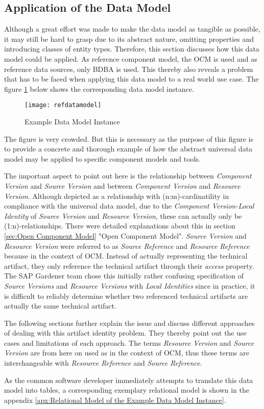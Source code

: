 \subsection{Application of the Data Model} \label{sec:Application of the Data Model}
Although a great effort was made to make the data model as tangible as possible, it may still be hard to grasp due to its abstract nature, omitting properties and introducing classes of entity types. Therefore, this section discusses how this data model could be applied. As reference component model, the OCM is used and as reference data sources, only BDBA is used. This thereby also reveals a problem that has to be faced when applying this data model to a real world use case. The figure \ref{fig:RefDataModel} below shows the corresponding data model instance.\par

\begin{figure}[H]
	\centering
	\texttt{[image: refdatamodel]}
	\caption[Data Model Instance]{Example Data Model Instance }
	\label{fig:RefDataModel}
\end{figure}

The figure is very crowded. But this is necessary as the purpose of this figure is to provide a concrete and thorough example of how the abstract universal data model may be applied to specific component models and tools.\par
The important aspect to point out here is the relationship between \emph{Component Version} and \emph{Source Version} and between \emph{Component Version} and \emph{Resource Version}. Although depicted as a relationship with (n:m)-cardinatility in compliance with the universal data model, due to the \emph{Component Version-Local Identity} of \emph{Source Version} and \emph{Resource Version}, these can actually only be (1:n)-relationships. There were detailed explanations about this in section \ref{sec:Open Component Model} "Open Component Model". \emph{Source Version} and \emph{Resource Version} were referred to as \emph{Source Reference} and \emph{Resource Reference} because in the context of OCM. Instead of actually representing the technical artifact, they only reference the technical artifact through their \emph{access} property. The SAP Gardener team chose this initially rather confusing specification of \emph{Source Versions} and \emph{Resource Versions} with \emph{Local Identities} since in practice, it is difficult to reliably determine whether two referenced technical artifacts are actually the same technical artifact.\par 
The following sections further explain the issue and discuss different approaches of dealing with this artifact identity problem. They thereby point out the use cases and limitations of each approach. The terms \emph{Resource Version} and \emph{Source Version} are from here on used as in the context of OCM, thus these terms are interchangeable with \emph{Resource Reference} and \emph{Source Reference}.\par 
As the common software developer immediately attempts to translate this data model into tables, a corresponding exemplary relational model is shown in the appendix \ref{apx:Relational Model of the Example Data Model Instance}.  

